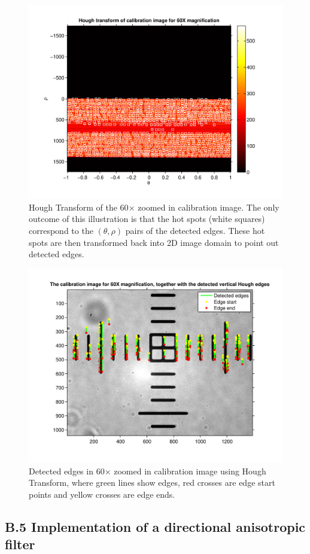 \documentclass{article}
\begin{document}
\begin{figure}
\centering
\includegraphics[width=0.75\linewidth]{figures/houghTrans.pdf}
\caption{Hough Transform of the 60$\times$ zoomed in calibration image. The only outcome of this illustration is that the hot spots (white squares) correspond to the $(\theta, \rho)$ pairs of the detected edges. These hot spots are then transformed back into 2D image domain to point out detected edges.}
\label{fig:houghT}
\end{figure}

\begin{figure}
\centering
\includegraphics[width=0.75\linewidth]{figures/autocalibration.pdf}
\caption{Detected edges in 60$\times$ zoomed in calibration image using Hough Transform, where green lines show edges, red crosses are edge start points and yellow crosses are edge ends.}
\label{fig:autoCalib}
\end{figure}


\subsection*{B.5 Implementation of a directional anisotropic filter}
\end{document}
